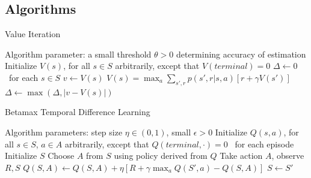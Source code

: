 \documentclass[11pt]{article} %
\begin{document}
\subsection{Algorithms}

\begin{algorithm}
  \caption{Value Iteration}

  \State Algorithm parameter: a small threshold $\theta > 0$ determining accuracy of estimation
  \State Initialize $V(s)$, for all $s \in S$ arbitrarily, except that $V(terminal) = 0$
  \State
  \While{$\Delta > \theta$}
    \State $\Delta \leftarrow 0$
    \Loop \ for each $s \in S$
      \State $v \leftarrow V(s)$
      \State $ V(s) = \max_a \sum_{s',r} p(s',r|s,a) \left[ r + \gamma V(s') \right] $
      \State $\Delta \leftarrow \max(\Delta, |v - V(s)|)$
    \EndLoop
  \EndWhile

\end{algorithm}

\begin{algorithm}
  \caption{Betamax Temporal Difference Learning}

  \State Algorithm parameters: step size $\eta \in (0, 1)$, small $\epsilon > 0$
  \State Initialize $Q(s,a)$, for all $s \in S$, $a \in A$ arbitrarily, except that $Q(terminal,\cdot) = 0$
  \State
  \Loop \ for each episode
    \State Initialize $S$
      \State Choose $A$ from $S$ using policy derived from $Q$
      \State Take action $A$, observe $R, S$
      \State $Q(S, A) \leftarrow Q(S, A) + \eta \left[ R + \gamma \max_a Q(S',a) − Q(S, A) \right] $
      \State $S \leftarrow S'$
    \EndWhile
  \EndLoop

\end{algorithm}
\end{document}
